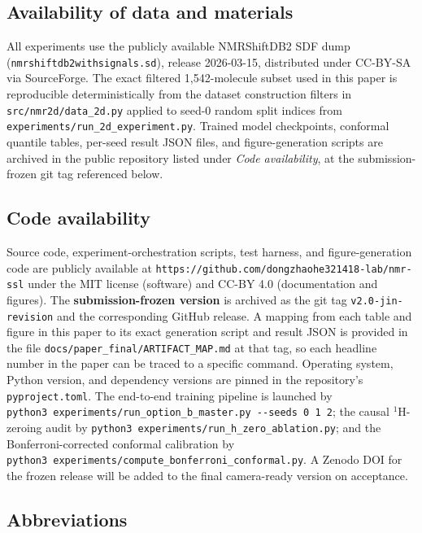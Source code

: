 \documentclass[
  11pt,
  a4paper,
]{article}
\begin{document}
\subsection*{Availability of data and materials}

All experiments use the publicly available NMRShiftDB2 SDF dump
(\texttt{nmrshiftdb2withsignals.sd}), release 2026-03-15, distributed under
CC-BY-SA via SourceForge. The exact filtered 1,542-molecule subset
used in this paper is reproducible deterministically from the
dataset construction filters in \texttt{src/nmr2d/data\_2d.py} applied to
seed-0 random split indices from \texttt{experiments/run\_2d\_experiment.py}.
Trained model checkpoints, conformal quantile tables, per-seed
result JSON files, and figure-generation scripts are archived in
the public repository listed under \emph{Code availability}, at the
submission-frozen git tag referenced below.

\subsection*{Code availability}

Source code, experiment-orchestration scripts, test harness, and
figure-generation code are publicly available at
\texttt{https://github.com/dongzhaohe321418-lab/nmr-ssl} under the MIT
license (software) and CC-BY 4.0 (documentation and figures). The
\textbf{submission-frozen version} is archived as the git tag
\texttt{v2.0-jin-revision} and the corresponding GitHub release. A
mapping from each table and figure in this paper to its exact
generation script and result JSON is provided in the file
\texttt{docs/paper\_final/ARTIFACT\_MAP.md} at that tag, so each headline
number in the paper can be traced to a specific command. Operating
system, Python version, and dependency versions are pinned in the
repository's \texttt{pyproject.toml}. The end-to-end training pipeline is
launched by
\texttt{python3\ experiments/run\_option\_b\_master.py\ -\/-seeds\ 0\ 1\ 2};
the causal \(^{1}\)H-zeroing audit by
\texttt{python3\ experiments/run\_h\_zero\_ablation.py};
and the Bonferroni-corrected conformal calibration by
\texttt{python3\ experiments/compute\_bonferroni\_conformal.py}. A Zenodo
DOI for the frozen release will be added to the final
camera-ready version on acceptance.

\subsection*{Abbreviations}
\end{document}
